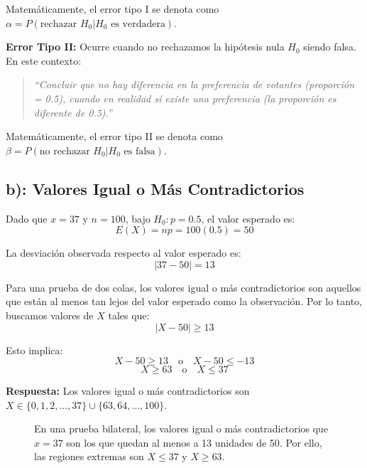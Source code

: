 \documentclass[12pt]{article}
\begin{document}
Matemáticamente, el error tipo I se denota como $\alpha = P(\text{rechazar } H_0 | H_0 \text{ es verdadera})$.

\textbf{Error Tipo II:} Ocurre cuando no rechazamos la hipótesis nula $H_0$ siendo falsa. En este contexto:

\begin{quote}
    \textit{``Concluir que no hay diferencia en la preferencia de votantes (proporción = 0.5), cuando en realidad sí existe una preferencia (la proporción es diferente de 0.5).''}
\end{quote}

Matemáticamente, el error tipo II se denota como $\beta = P(\text{no rechazar } H_0 | H_0 \text{ es falsa})$.

\subsection*{b): Valores Igual o Más Contradictorios}

Dado que $x = 37$ y $n = 100$, bajo $H_0: p = 0.5$, el valor esperado es:
$$E(X) = np = 100(0.5) = 50$$

La desviación observada respecto al valor esperado es:
$$|37 - 50| = 13$$

Para una prueba de dos colas, los valores igual o más contradictorios son aquellos que están al menos tan lejos del valor esperado como la observación. Por lo tanto, buscamos valores de $X$ tales que:
$$|X - 50| \geq 13$$

Esto implica:
$$X - 50 \geq 13 \quad \text{o} \quad X - 50 \leq -13$$
$$X \geq 63 \quad \text{o} \quad X \leq 37$$

\textbf{Respuesta:} Los valores igual o más contradictorios son $X \in \{0, 1, 2, \ldots, 37\} \cup \{63, 64, \ldots, 100\}$.

\begin{figure}[H]
\centering
{}
\caption{En una prueba bilateral, los valores igual o más contradictorios que $x=37$ son los que quedan al menos a 13 unidades de 50. Por ello, las regiones extremas son $X\leq 37$ y $X\geq 63$.}
\end{figure}
\end{document}
